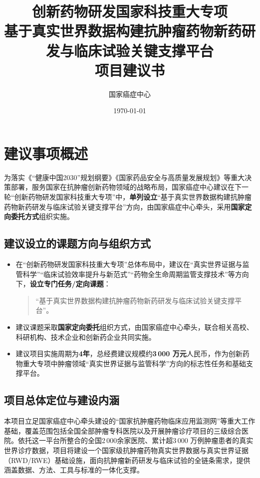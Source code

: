 \documentclass[12pt, a4paper, fontset=mac]{ctexart} %
\title{%
  创新药物研发国家科技重大专项\\[4pt]
  \large 基于真实世界数据构建抗肿瘤药物新药研发与临床试验关键支撑平台\\[8pt]
  \large 项目建议书
}
\author{国家癌症中心}
\date{\today}
\begin{document}
\maketitle

\tableofcontents
\newpage

\section{建议事项概述}

为落实《“健康中国2030”规划纲要》《国家药品安全与高质量发展规划》等重大决策部署，服务国家在抗肿瘤创新药物领域的战略布局，国家癌症中心建议在下一轮“创新药物研发国家科技重大专项”中，\textbf{单列设立}“基于真实世界数据构建抗肿瘤药物新药研发与临床试验关键支撑平台”方向，由国家癌症中心牵头，采用\textbf{国家定向委托方式}组织实施。

\subsection{建议设立的课题方向与组织方式}

\begin{itemize}
  \item 在“创新药物研发国家科技重大专项”总体布局中，建议在“真实世界证据与监管科学”“临床试验效率提升与新范式”“药物全生命周期监管支撑技术”等方向下，\textbf{设立专门任务/定向课题}：
  \begin{quote}
    “基于真实世界数据构建抗肿瘤药物新药研发与临床试验关键支撑平台”。
  \end{quote}
  \item 建议课题采取\textbf{国家定向委托}组织方式，由国家癌症中心牵头，联合相关高校、科研机构、技术企业和创新药企业共同实施。
  \item 建议项目实施周期为\textbf{4年}，总经费建议规模约\textbf{3\,000 万元}人民币，作为创新药物重大专项中肿瘤领域“真实世界证据与监管科学”方向的标志性任务和基础支撑平台。
\end{itemize}

\subsection{项目总体定位与建设内涵}

本项目立足国家癌症中心牵头建设的“国家抗肿瘤药物临床应用监测网”等重大工作基础，覆盖范围包括全国全部肿瘤专科医院以及开展肿瘤诊疗项目的三级综合医院。依托这一平台所整合的全国2\,000余家医院、累计超3\,000 万例肿瘤患者的真实世界诊疗数据，项目将建设一个国家级抗肿瘤药物真实世界数据与真实世界证据（RWD/RWE）基础设施，面向抗肿瘤新药研发与临床试验的全链条需求，提供涵盖数据、方法、工具与标准的一体化支撑。
\end{document}
